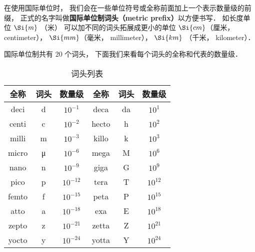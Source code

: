 


在使用国际单位时， 我们会在一些单位符号或全称前面加上一个表示数量级的前缀， 正式的名字叫做\textbf{国际单位制词头（metric prefix）}以方便书写． 如长度单位 $\Si{m}$ （米） 可以加不同的词头拓展成更小的单位 $\Si{cm}$（厘米， centimeter）， $\Si{mm}$（毫米， millimeter）， $\Si{km}$ （千米， kilometer）．

国际单位制共有 20 个词头， 下面我们来看每个词头的全称和代表的数量级．

\begin{table}[ht]
\centering
\caption{词头列表}\label{UniPre_tab1}
\begin{tabular}{|c|c|c|c|c|c|}
\hline
全称 & 词头 & 数量级 & 全称 & 词头 & 数量级 \\
\hline
deci & d & $10^{-1}$ & deca & da & $10^1$ \\
\hline
centi & c & $10^{-2}$ & hecto & h & $10^2$ \\
\hline
milli & m & $10^{-3}$ & killo & k & $10^3$ \\
\hline
micro & μ & $10^{-6}$ & mega & M & $10^6$ \\
\hline
nano & n & $10^{-9}$ & giga & G & $10^9$ \\
\hline
pico & p & $10^{-12}$ & tera & T & $10^{12}$ \\
\hline
femto & f & $10^{-15}$ & peta & P & $10^{15}$ \\
\hline
atto & a & $10^{-18}$ & exa & E & $10^{18}$ \\
\hline
zepto & z & $10^{-21}$ & zetta & Z & $10^{21}$ \\
\hline
yocto & y & $10^{-24}$ & yotta & Y & $10^{24}$ \\
\hline
\end{tabular}
\end{table}
